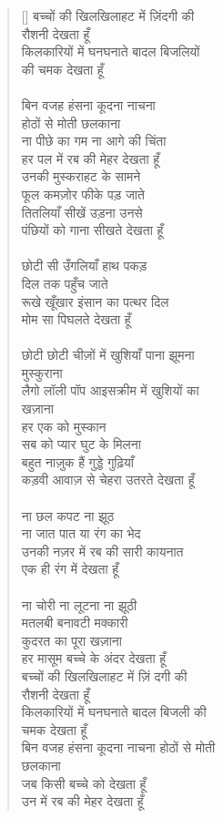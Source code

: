 \begin{verse}[\versewidth]\texthindi{
बच्चों की खिलखिलाहट में ज़िंदगी की\\
रौशनी देखता हूँ\\
किलकारियों में घनघनाते बादल बिजलियों\\
की चमक देखता हूँ\\
\\
बिन वजह हंसना कूदना नाचना\\
होठों से मोती छलकाना\\
ना पीछे का गम ना आगे की चिंता\\
हर पल में रब की मेहर देखता हूँ\\
उनकी मुस्कराहट के सामने\\
फूल कमज़ोर फीके पड़ जाते\\
तितलियाँ सीखें उड़ना उनसे\\
पंछियों को गाना सीखते देखता हूँ\\
\\
छोटी सी उँगलियाँ हाथ पकड़\\
दिल तक पहुँच जाते\\
रूखे खूँखार इंसान का पत्थर दिल\\
मोम सा पिघलते देखता हूँ\\
\\
छोटी छोटी चीज़ों में खुशियाँ पाना झूमना\\
मुस्कुराना\\
लैगो लॉली पॉप आइसक्रीम में खुशियों का\\
खज़ाना\\
हर एक को मुस्कान\\
सब को प्यार घुट के मिलना\\
बहुत नाज़ुक हैं गुड्डे गुढ़ियाँ\\
कड़वी आवाज़ से चेहरा उतरते देखता हूँ\\
\\
ना छल कपट ना झूठ\\
ना जात पात या रंग का भेद\\
उनकी नज़र में रब की सारी कायनात\\
एक ही रंग में देखता हूँ\\
\\
ना चोरी ना लूटना ना झूठी\\
मतलबी बनावटी मक्कारी\\
कुदरत का पूरा खज़ाना\\
हर मासूम बच्चे के अंदर देखता हूँ\\
बच्चों की खिलखिलाहट में ज़िं दगी की\\
रौशनी देखता हूँ\\
किलकारियों में घनघनाते बादल बिजली की\\
चमक देखता हूँ\\
बिन वजह हंसना कूदना नाचना होठों से मोती\\
छलकाना\\
जब किसी बच्चे को देखता हूँ\\
उन में रब की मेहर देखता हूँ
}\end{verse}

